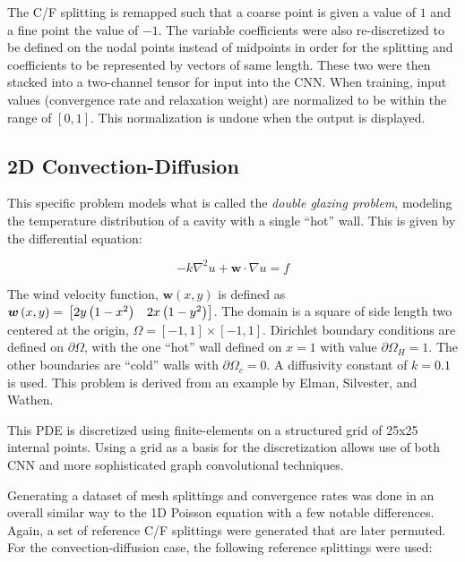 \documentclass[review]{siamart190516}
\renewcommand{\vec}[1]{\bm{{#1}}}
\newcommand{\grad}{\nabla}
\begin{document}
The C/F splitting is remapped such that a coarse point is given a value of $1$ and a fine point the value of $-1$.  The variable coefficients were also re-discretized to be defined on the nodal points instead of midpoints in order for the splitting and coefficients to be represented by vectors of same length.  These two were then stacked into a two-channel tensor for input into the CNN.  When training, input values (convergence rate and relaxation weight) are normalized to be within the range of $\left[0,1\right]$.  This normalization is undone when the output is displayed.

\subsection{2D Convection-Diffusion}\label{subsec:methods_conv}

This specific problem models what is called the \textit{double glazing problem}, modeling the temperature distribution of a cavity with a single ``hot'' wall.  This is given by the differential equation:

\begin{equation}\label{eqn:conv}
  -k\grad^2u + \vec{w}\cdot\grad u = f
\end{equation}

The wind velocity function, $\vec{w}\left(x,y\right)$ is defined as $\vec{w}\left(x,y\right)=\\ \begin{bmatrix} 2y\left(1-x^2\right) & 2x\left(1-y^2\right) \end{bmatrix}$.  The domain is a square of side length two centered at the origin, $\Omega = \left[-1,1\right] \times \left[-1,1\right]$.  Dirichlet boundary conditions are defined on $\partial \Omega$, with the one ``hot'' wall defined on $x=1$ with value $\partial \Omega_H=1$.  The other boundaries are ``cold'' walls with $\partial \Omega_c=0$.  A diffusivity constant of $k=0.1$ is used.  This problem is derived from an example by Elman, Silvester, and Wathen\cite{silvester}.

This PDE is discretized using finite-elements on a structured grid of 25x25 internal points.  Using a grid as a basis for the discretization allows use of both CNN and more sophisticated graph convolutional techniques.

Generating a dataset of mesh splittings and convergence rates was done in an overall similar way to the 1D Poisson equation with a few notable differences.  Again, a set of reference C/F splittings were generated that are later permuted.  For the convection-diffusion case, the following reference splittings were used:
\end{document}
